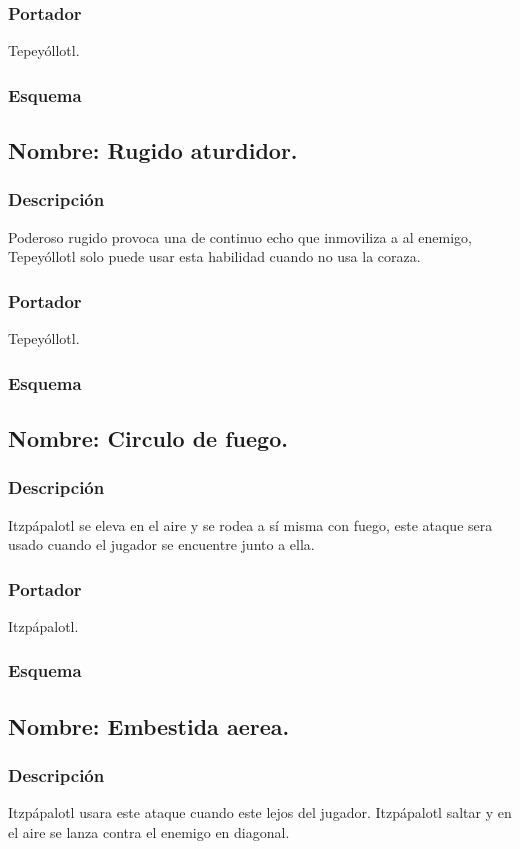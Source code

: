 \documentclass[11pt,letterpaper]{article}
\begin{document}
\subsubsection{Portador}
Tepeyóllotl.
\subsubsection{Esquema}
\subsection{Nombre: Rugido aturdidor.}
\subsubsection{Descripción}
Poderoso rugido provoca una de continuo echo que inmoviliza a al enemigo, Tepeyóllotl solo puede usar esta habilidad cuando no usa la coraza. 
\subsubsection{Portador}
Tepeyóllotl. 
\subsubsection{Esquema}
\subsection{Nombre: Circulo de fuego.}
\subsubsection{Descripción}
Itzpápalotl se eleva en el aire y se rodea a sí misma con fuego, este ataque sera usado cuando el jugador se encuentre junto a ella.
\subsubsection{Portador}
Itzpápalotl. 
\subsubsection{Esquema}
\subsection{Nombre: Embestida aerea.}
\subsubsection{Descripción}
Itzpápalotl usara este ataque cuando este lejos del jugador. Itzpápalotl saltar y en el aire se lanza contra el enemigo en diagonal.
\end{document}
